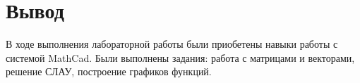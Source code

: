 \section*{Вывод}

В ходе выполнения лабораторной работы были приобетены навыки работы с
системой MathCad.
Были выполнены задания: работа с матрицами и векторами, решение СЛАУ,
построение графиков функций.
